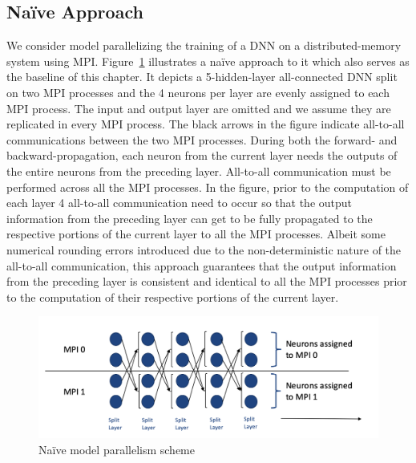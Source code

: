 \subsection{Na\"{i}ve Approach}
We consider model parallelizing the training of a DNN on a distributed-memory 
system using MPI. Figure~\ref{fig:altsplit_baseline} illustrates a na\"{i}ve 
approach to it which also serves as the baseline of this chapter. It depicts a 
5-hidden-layer all-connected DNN split on two MPI processes and the 4 neurons 
per layer are evenly assigned to each MPI process. The input and output layer 
are omitted and we assume they are replicated in every MPI process. The black 
arrows in the figure indicate all-to-all communications between the two MPI 
processes. During both the forward- and backward-propagation, each neuron from 
the current layer needs the outputs of the entire neurons from the preceding 
layer. All-to-all communication must be performed across all the MPI 
processes. In the figure, prior to the computation of each layer 4 all-to-all 
communication need to occur so that the output information from the preceding 
layer can get to be fully propagated to the respective portions of the current 
layer to all the MPI processes.  Albeit some numerical rounding errors 
introduced due to the non-deterministic nature of the all-to-all communication, 
this approach guarantees that the output information from the preceding layer is 
consistent and identical to all the MPI processes prior to the computation of 
their respective portions of the current layer.
\begin{figure}[H]
    \centerline{\includegraphics[scale=0.60]{altsplit/figs/baseline.png}}
    \caption{Na\"{i}ve model parallelism scheme}
    \label{fig:altsplit_baseline}
\end{figure}

